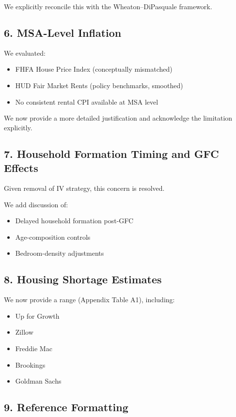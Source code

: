 \documentclass[12pt]{article}
\begin{document}
We explicitly reconcile this with the Wheaton–DiPasquale framework.

\subsection*{6. MSA-Level Inflation}

We evaluated:

\begin{itemize}
\item FHFA House Price Index (conceptually mismatched)
\item HUD Fair Market Rents (policy benchmarks, smoothed)
\item No consistent rental CPI available at MSA level
\end{itemize}

We now provide a more detailed justification and acknowledge the limitation explicitly.

\subsection*{7. Household Formation Timing and GFC Effects}

Given removal of IV strategy, this concern is resolved.

We add discussion of:

\begin{itemize}
\item Delayed household formation post-GFC
\item Age-composition controls
\item Bedroom-density adjustments
\end{itemize}

\subsection*{8. Housing Shortage Estimates}

We now provide a range (Appendix Table A1), including:

\begin{itemize}
\item Up for Growth
\item Zillow
\item Freddie Mac
\item Brookings
\item Goldman Sachs
\end{itemize}

\subsection*{9. Reference Formatting}
\end{document}
